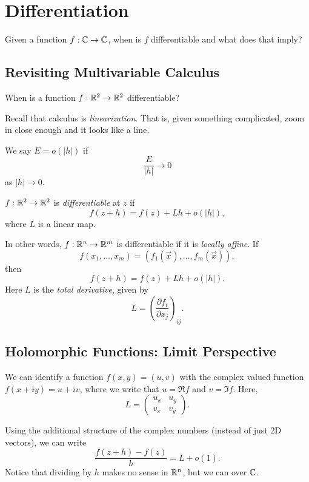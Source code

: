 \chapter{Differentiation}

Given a function $f : \mathbb{C} \to \mathbb{C}$, when is $f$
differentiable and what does that imply?

\section{Revisiting Multivariable Calculus}
When is a function $f : \mathbb{R}^2 \to \mathbb{R}^2$ differentiable?

Recall that calculus is \textit{linearization}. That is,
given something complicated, zoom in close enough and
it looks like a line.

\begin{tcolorbox}[title=Definition (Little-$o$)]
  We say $E = o(|h|)$ if
  \[\frac{E}{|h|} \to 0\]
  as $|h| \to 0$.
\end{tcolorbox}

\begin{tcolorbox}[title=Definition (Differentiability in $\R^2$)]
  $f : \mathbb{R}^2 \to \mathbb{R}^2$ is \textit{differentiable} at
  $z$ if
  \[f(z + h) = f(z) + Lh + o(|h|),\]
  where $L$ is a linear map.
\end{tcolorbox}

In other words, $f : \mathbb{R}^n \to \mathbb{R}^m$ is differentiable if
it is \textit{locally affine}. If
\[
f(x_1, \dots, x_m) = (f_1(\vec{x}), \dots, f_m(\vec{x}))
,\]
then
\[
f(z + h) = f(z) + Lh + o(|h|)
.\] 
Here $L$ is the \textit{total derivative}, given by
\[
  L = \left(\frac{\partial f_i}{\partial x_j}\right)_{ij}
.\]

\section{Holomorphic Functions: Limit Perspective}
We can identify a function $f(x, y) = (u, v)$ with
the complex valued function $f(x + iy) = u + iv$, where
we write that $u = \Re f$ and $v = \Im f$. Here,
\[
L =
\left(\begin{matrix}
  u_x & u_y \\
  v_x & v_y
\end{matrix}\right)
.\] 

Using the additional structure of the complex numbers
(instead of just 2D vectors), we can write
\[\frac{f(z + h) - f(z)}{h} = L + o(1).\]
Notice that dividing by $h$ makes no sense in $\mathbb{R}^n$, but
we can over $\mathbb{C}$.

